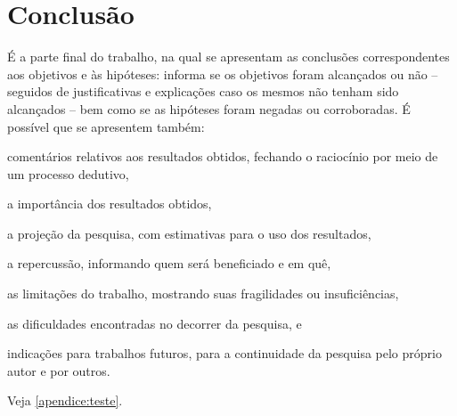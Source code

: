 \documentclass[12pt,oneside,a4paper,chapter=TITLE,section=TITLE,sumario=tradicional]{abntex2}
\begin{document}
\chapter{Conclusão}

É a parte final do trabalho, na qual se apresentam as conclusões 
correspondentes aos objetivos e às hipóteses: informa se os objetivos foram 
alcançados ou não – seguidos de justificativas e explicações caso os mesmos não 
tenham sido alcançados – bem como se as hipóteses foram negadas ou 
corroboradas. É possível que se apresentem também:

\begin{lista}
    \item comentários relativos aos resultados obtidos, fechando o raciocínio 
    por meio de um processo dedutivo,
    
    \item a importância dos resultados obtidos,
    
    \item a projeção da pesquisa, com estimativas para o uso dos resultados,
    
    \item a repercussão, informando quem será beneficiado e em quê,
    
    \item as limitações do trabalho, mostrando suas fragilidades ou
insuficiências,
    \item as dificuldades encontradas no decorrer da pesquisa, e
    \item indicações para trabalhos futuros, para a continuidade da
pesquisa pelo próprio autor e por outros.
\end{lista}

Veja \autoref{apendice:teste}.





\end{document}
